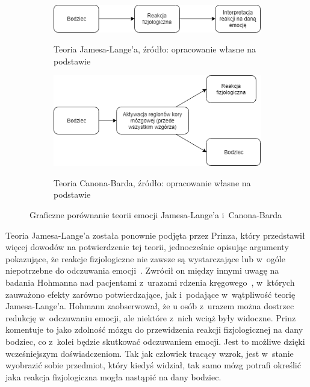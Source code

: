 \begin{figure}[h]
	\centering
	\begin{subfigure}{0.7\textwidth}
		\includegraphics[width=\linewidth]{images/james-lang.png}
		\label{fig:james}
		\caption{Teoria Jamesa-Lange'a, źródło: opracowanie własne na podstawie~\cite{Coleman2011}}
	\end{subfigure}
	\begin{subfigure}{0.7\textwidth}
		\includegraphics[width=\linewidth]{images/cannon-bard.png}
		\label{fig:canon}
		\caption{Teoria Canona-Barda, źródło: opracowanie własne na podstawie~\cite{cannon_1927}}
	\end{subfigure}
	\caption{Graficzne porównanie teorii emocji Jamesa-Lange'a i~Canona-Barda}
\end{figure}

Teoria Jamesa-Lange'a została ponownie podjęta przez Prinza, który przedstawił więcej dowodów na potwierdzenie tej teorii, jednocześnie opisując argumenty pokazujące, że reakcje fizjologiczne nie zawsze są wystarczające lub w~ogóle niepotrzebne do odczuwania emocji~\cite{Prinz2004-PRIEE-2}. Zwrócił on między innymi uwagę na badania Hohmanna nad pacjentami z~urazami rdzenia kręgowego~\cite{Hohmann1966SomeEO}, w~których zauważono efekty zarówno potwierdzające, jak i~podające w~wątpliwość teorię Jamesa-Lange'a. Hohmann zaobserwował, że u osób z~urazem można dostrzec redukcję w~odczuwaniu emocji, ale niektóre z~nich wciąż były widoczne. Prinz komentuje to jako zdolność mózgu do przewidzenia reakcji fizjologicznej na dany bodziec, co z~kolei będzie skutkować odczuwaniem emocji. Jest to możliwe dzięki wcześniejszym doświadczeniom. Tak jak człowiek tracący wzrok, jest w~stanie wyobrazić sobie przedmiot, który kiedyś widział, tak samo mózg potrafi określić jaka reakcja fizjologiczna mogła nastąpić na dany bodziec.

